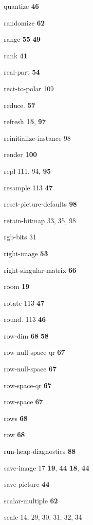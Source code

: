 \begin{theindex}
\item {\ptt quantize}
 {\bf 46}
\item {\ptt randomize} {\bf 62}
\item {\ptt range} {\bf 55}
 {\bf 49}
\item {\ptt rank} {\bf 41}
\item {\ptt real-part} {\bf 54}
\item {\ptt rect-to-polar} 109
\item {\ptt reduce.} {\bf 57}
\item {\ptt refresh} {\bf 15}, {\bf 97}
\item {\ptt reinitialize-instance} 98
\item {\ptt render} {\bf 100}
\item {\ptt repl} 111, 94, {\bf 95}
\item {\ptt resample} 113
 {\bf 47}
\item {\ptt reset-picture-defaults} {\bf 98}
\item {\ptt retain-bitmap} 33, 35, 98
\item {\ptt rgb-bits} 31
\item {\ptt right-image} {\bf 53}
\item {\ptt right-singular-matrix} {\bf 66}
\item {\ptt room} {\bf 19}
\item {\ptt rotate} 113
 {\bf 47}
\item {\ptt round.} 113
 {\bf 46}
\item {\ptt row-dim} {\bf 68}
 {\bf 58}
\item {\ptt row-null-space-qr} {\bf 67}
\item {\ptt row-null-space} {\bf 67}
\item {\ptt row-space-qr} {\bf 67}
\item {\ptt row-space} {\bf 67}
\item {\ptt rows} {\bf 68}
\item {\ptt row} {\bf 68}
\item {\ptt run-heap-diagnostics} {\bf 88}
\item {\ptt save-image} 17
 {\bf 19}, {\bf 44}
 {\bf 18}, {\bf 44}
\item {\ptt save-picture} {\bf 44}
\item {\ptt scalar-multiple} {\bf 62}
\item {\ptt scale} 14, 29, 30, 31, 32, 34

\end{theindex}
